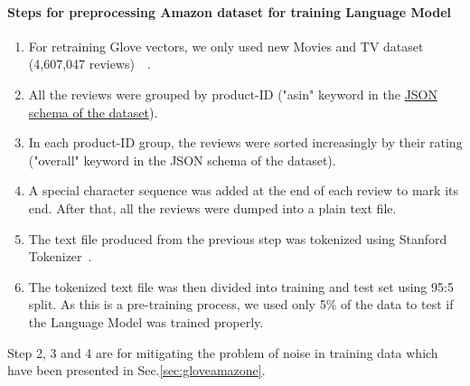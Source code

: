 \paragraph{Steps for preprocessing Amazon dataset for training Language Model}
\label{sec:preprocessamazonglove-LM}
\begin{enumerate}
\item For retraining Glove vectors, we only used new Movies and TV dataset (4,607,047 reviews)~\cite{McAuleyTSH15}~\cite{HeM16}.
\item All the reviews were grouped by product-ID ("asin" keyword in the \hyperref[sec:amazon]{JSON schema of the dataset}).
\item In each product-ID group, the reviews were sorted increasingly by their rating ("overall" keyword in the JSON schema of the dataset).
\item A special character sequence was added at the end of each review to mark its end.
After that, all the reviews were dumped into a plain text file.
\item The text file produced from the previous step was tokenized using Stanford Tokenizer~\cite{tokenizerpart}.
\item The tokenized text file was then divided into training and test set using 95:5 split.
As this is a pre-training process, we used only 5\% of the data to test if the Language Model was trained properly.
\end{enumerate}

Step 2, 3 and 4 are for mitigating the problem of noise in training data which have been presented in Sec.\ref{sec:gloveamazone}.
